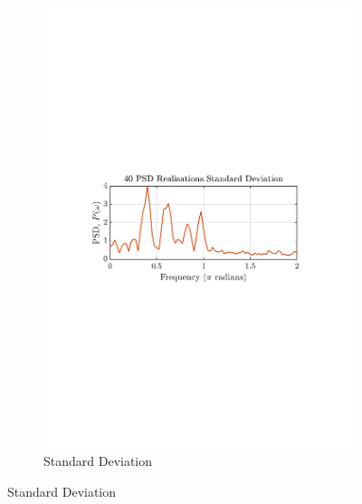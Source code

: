 \documentclass[12pt]{article}
\begin{document}
\begin{figure}[H]
\begin{subfigure}{0.49\textwidth}
			\includegraphics[trim={2.2cm 11.2cm 3.15cm  11.2cm}, clip, width=\textwidth]{../MATLAB/figures/q1_3b_fig02.pdf} 
			\captionsetup{justification=centering}
			\caption{Standard Deviation}
		\end{subfigure}
		\label{fig: 1-3b}
	\end{figure}
\end{document}
